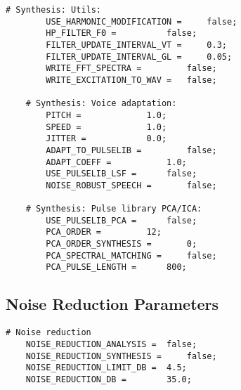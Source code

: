 \begin{lstlisting}[caption = Configuration file]
	# Synthesis: Utils:
		USE_HARMONIC_MODIFICATION = 	false;
		HP_FILTER_F0 = 			false;
		FILTER_UPDATE_INTERVAL_VT = 	0.3;
		FILTER_UPDATE_INTERVAL_GL = 	0.05;
		WRITE_FFT_SPECTRA = 		false;
		WRITE_EXCITATION_TO_WAV = 	false;

	# Synthesis: Voice adaptation:
		PITCH = 			1.0;
		SPEED = 			1.0;
		JITTER = 			0.0;
		ADAPT_TO_PULSELIB = 		false;
		ADAPT_COEFF = 			1.0;
		USE_PULSELIB_LSF = 		false;
		NOISE_ROBUST_SPEECH = 		false;

	# Synthesis: Pulse library PCA/ICA:
		USE_PULSELIB_PCA =		false;
		PCA_ORDER =			12;
		PCA_ORDER_SYNTHESIS =		0;
		PCA_SPECTRAL_MATCHING = 	false;
		PCA_PULSE_LENGTH = 		800;
\end{lstlisting}

\subsection{Noise Reduction Parameters}
\label{glott_conf_noise_red}

\begin{lstlisting}[caption = Noise reduction parameters in GlottHMM's configuration file]
# Noise reduction
	NOISE_REDUCTION_ANALYSIS = 	false;
	NOISE_REDUCTION_SYNTHESIS = 	false;
	NOISE_REDUCTION_LIMIT_DB = 	4.5;
	NOISE_REDUCTION_DB = 		35.0;
\end{lstlisting}